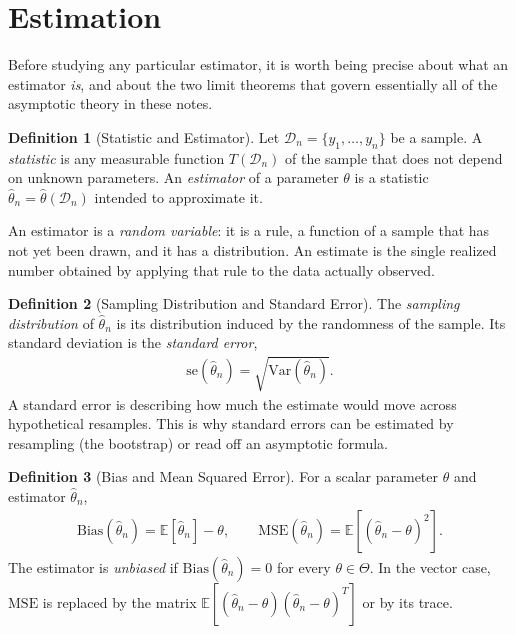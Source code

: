 \documentclass[11pt]{article}
\theoremstyle{definition}
\newtheorem{definition}{Definition}[section]
\theoremstyle{plain}
\theoremstyle{remark}
\begin{document}
\section{Estimation}

Before studying any particular estimator, it is worth being precise about what an estimator \emph{is}, and about the two limit theorems that govern essentially all of the asymptotic theory in these notes.

\begin{definition}[Statistic and Estimator]
    Let $\mathcal{D}_n = \{y_1,\dots,y_n\}$ be a sample. A \emph{statistic} is any measurable function $T(\mathcal{D}_n)$ of the sample that does not depend on unknown parameters. An \emph{estimator} of a parameter $\theta$ is a statistic $\hat{\theta}_n = \hat{\theta}(\mathcal{D}_n)$ intended to approximate it.

    An estimator is a \emph{random variable}: it is a rule, a function of a sample that has not yet been drawn, and it has a distribution. An estimate is the single realized number obtained by applying that rule to the data actually observed.
\end{definition}

\begin{definition}[Sampling Distribution and Standard Error]
    The \emph{sampling distribution} of $\hat{\theta}_n$ is its distribution induced by the randomness of the sample. Its standard deviation is the \emph{standard error},
    \begin{align}
        \mathrm{se}(\hat{\theta}_n) = \sqrt{\mathrm{Var}(\hat{\theta}_n)}.
    \end{align}
    A standard error is describing how much the estimate would move across hypothetical resamples. This is why standard errors can be estimated by resampling (the bootstrap) or read off an asymptotic formula.
\end{definition}

\begin{definition}[Bias and Mean Squared Error]
    For a scalar parameter $\theta$ and estimator $\hat{\theta}_n$,
    \begin{align}
        \mathrm{Bias}(\hat{\theta}_n) = \mathbb{E}[\hat{\theta}_n] - \theta, \qquad
        \mathrm{MSE}(\hat{\theta}_n) = \mathbb{E}\!\left[(\hat{\theta}_n - \theta)^2\right].
    \end{align}
    The estimator is \emph{unbiased} if $\mathrm{Bias}(\hat{\theta}_n) = 0$ for every $\theta \in \Theta$. In the vector case, $\mathrm{MSE}$ is replaced by the matrix $\mathbb{E}[(\hat{\theta}_n-\theta)(\hat{\theta}_n-\theta)^T]$ or by its trace.
\end{definition}
\end{document}
